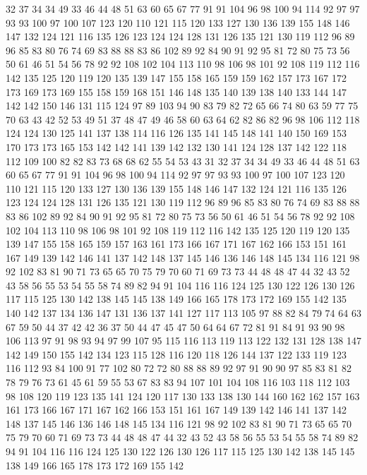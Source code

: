 32 37 34 34 49 33 46 44 48 51 63 60 65 67 77 91 91 104 96 98
100 94 114 92 97 97 93 93 100 97 100 107 123 120 110 121 115 120 133 127
130 136 139 155 148 146 147 132 124 121 116 135 126 123 124 124 128 131 126 135
121 130 119 112 96 89 96 85 83 80 76 74 69 83 88 88 83 86 102 89
92 84 90 91 92 95 81 72 80 75 73 56 50 61 46 51 54 56 78 92
92 108 102 104 113 110 98 106 98 101 92 108 119 112 116 142 135 125 120 119
120 135 139 147 155 158 165 159 159 162 157 173 167 172 173 169 173 169 155 158
159 168 151 146 148 135 140 139 138 140 133 144 147 142 142 150 146 131 115 124
97 89 103 94 90 83 79 82 72 65 66 74 80 63 59 77 75 70 63 43
42 52 53 49 51 37 48 47 49 46 58 60 63 64 62 82 86 82 96 98
106 112 118 124 124 130 125 141 137 138 114 116 126 135 141 145 148 141 140 150
169 153 170 173 173 165 153 142 142 141 139 142 132 130 141 124 128 137 142 122
118 112 109 100 82 82 83 73 68 68 62 55 54 53 43 31 32 37 34 34
49 33 46 44 48 51 63 60 65 67 77 91 91 104 96 98 100 94 114 92
97 97 93 93 100 97 100 107 123 120 110 121 115 120 133 127 130 136 139 155
148 146 147 132 124 121 116 135 126 123 124 124 128 131 126 135 121 130 119 112
96 89 96 85 83 80 76 74 69 83 88 88 83 86 102 89 92 84 90 91
92 95 81 72 80 75 73 56 50 61 46 51 54 56 78 92 92 108 102 104
113 110 98 106 98 101 92 108 119 112 116 142 135 125 120 119 120 135 139 147
155 158 165 159 157 163 161 173 166 167 171 167 162 166 153 151 161 167 149 139
142 146 141 137 142 148 137 145 146 136 146 148 145 134 116 121 98 92 102 83
81 90 71 73 65 65 70 75 79 70 60 71 69 73 73 44 48 48 47 44
32 43 52 43 58 56 55 53 54 55 58 74 89 82 94 91 104 116 116 124
125 130 122 126 130 126 117 115 125 130 142 138 145 145 138 149 166 165 178 173
172 169 155 142 135 140 142 137 134 136 147 131 136 137 141 127 117 113 105 97
88 82 84 79 74 64 63 67 59 50 44 37 42 42 36 37 50 44 47 45
47 50 64 64 67 72 81 91 84 91 93 90 98 106 113 97 91 98 93 94
97 99 107 95 115 116 113 119 113 122 132 131 128 138 147 142 149 150 155 142
134 123 115 128 116 120 118 126 144 137 122 133 119 123 116 112 93 84 100 91
77 102 80 72 72 80 88 88 89 92 97 91 90 90 97 85 83 81 82 78
79 76 73 61 45 61 59 55 53 67 83 83 94 107 101 104 108 116 103 118
112 103 98 108 120 119 123 135 141 124 120 117 130 133 138 130 144 160 162 162
157 163 161 173 166 167 171 167 162 166 153 151 161 167 149 139 142 146 141 137
142 148 137 145 146 136 146 148 145 134 116 121 98 92 102 83 81 90 71 73
65 65 70 75 79 70 60 71 69 73 73 44 48 48 47 44 32 43 52 43
58 56 55 53 54 55 58 74 89 82 94 91 104 116 116 124 125 130 122 126
130 126 117 115 125 130 142 138 145 145 138 149 166 165 178 173 172 169 155 142
